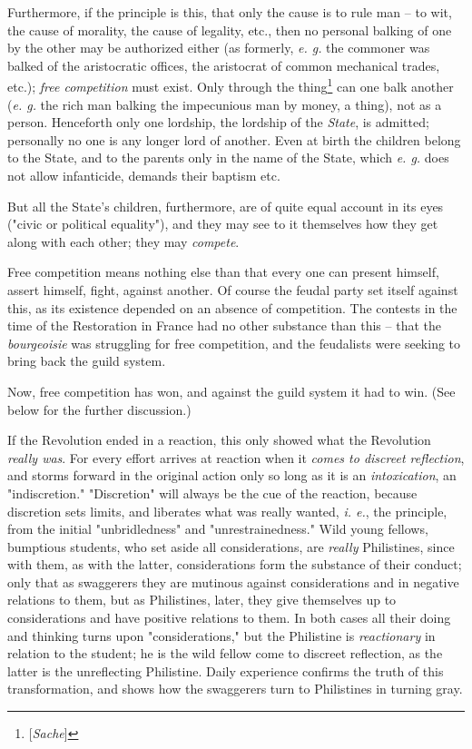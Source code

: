 Furthermore, if the principle is this, that only the cause is to rule man -- 
to wit, the cause of morality, the cause of legality, etc., then no personal 
balking of one by the other may be authorized either (as formerly, \textit{e. 
g.} the commoner was balked of the aristocratic offices, the aristocrat of 
common mechanical trades, etc.); \textit{free competition} must exist. Only 
through the thing\footnote{[\textit{Sache}]} can one balk another (\textit{e. 
g.} the rich man balking the impecunious man by money, a thing), not as a 
person. Henceforth only one lordship, the lordship of the \textit{State}, is 
admitted; personally no one is any longer lord of another. Even at birth the 
children belong to the State, and to the parents only in the name of the 
State, which \textit{e. g.} does not allow infanticide, demands their baptism 
etc.

But all the State's children, furthermore, are of quite equal account in its 
eyes ("{}civic or political equality"{}), and they may see to it themselves 
how they get along with each other; they may \textit{compete}.

Free competition means nothing else than that every one can present himself, 
assert himself, fight, against another. Of course the feudal party set itself 
against this, as its existence depended on an absence of competition. The 
contests in the time of the Restoration in France had no other substance than 
this -- that the \textit{bourgeoisie} was struggling for free competition, and 
the feudalists were seeking to bring back the guild system.

Now, free competition has won, and against the guild system it had to win. 
(See below for the further discussion.)

If the Revolution ended in a reaction, this only showed what the Revolution 
\textit{really was}. For every effort arrives at reaction when it 
\textit{comes to discreet reflection}, and storms forward in the original 
action only so long as it is an \textit{intoxication}, an "{}indiscretion."{} 
"{}Discretion"{} will always be the cue of the reaction, because discretion 
sets limits, and liberates what was really wanted, \textit{i. e.}, the 
principle, from the initial "{}unbridledness"{} and "{}unrestrainedness."{} 
Wild young fellows, bumptious students, who set aside all considerations, are 
\textit{really} Philistines, since with them, as with the latter, 
considerations form the substance of their conduct; only that as swaggerers 
they are mutinous against considerations and in negative relations to them, 
but as Philistines, later, they give themselves up to considerations and have 
positive relations to them. In both cases all their doing and thinking turns 
upon "{}considerations,"{} but the Philistine is \textit{reactionary} in 
relation to the student; he is the wild fellow come to discreet reflection, as 
the latter is the unreflecting Philistine. Daily experience confirms the truth 
of this transformation, and shows how the swaggerers turn to Philistines in 
turning gray.

